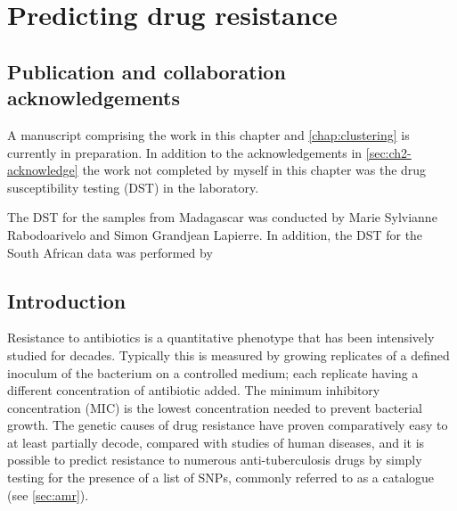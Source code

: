 \chapter{Predicting \mtb{} drug resistance}
\label{chap:dst}
\ifpdf
    \graphicspath{{Chapter3/Figs/Raster/}{Chapter3/Figs/PDF/}{Chapter3/Figs/}}
\else
    \graphicspath{{Chapter3/Figs/Vector/}{Chapter3/Figs/}}
\fi


\setcounter{section}{-1}
\section{Publication and collaboration acknowledgements}
\label{sec:ch3-acknowledge}

A manuscript comprising the work in this chapter and \autoref{chap:clustering} is currently in preparation. In addition to the acknowledgements in \autoref{sec:ch2-acknowledge} the work not completed by myself in this chapter was the drug susceptibility testing (DST) in the laboratory.

The DST for the samples from Madagascar was conducted by Marie Sylvianne Rabodoarivelo and Simon Grandjean Lapierre. In addition, the DST for the South African data was performed by 

\section{Introduction}

Resistance to antibiotics is a quantitative phenotype that has been intensively studied for decades. Typically this is measured by growing replicates of a defined inoculum of the bacterium on a controlled medium; each replicate having a different concentration of antibiotic added. The minimum inhibitory concentration (MIC) is the lowest concentration needed to prevent bacterial growth. The genetic causes of drug resistance have proven comparatively easy to at least partially decode, compared with studies of human diseases, and it is possible to predict resistance to numerous anti-tuberculosis drugs by simply testing for the presence of a list of SNPs, commonly referred to as a catalogue (see \autoref{sec:amr}).

